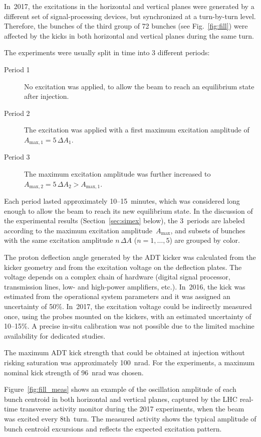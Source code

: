 \documentclass[
prstab
,reprint
,linenumbers
,longbibliography
,preprintnumbers
,showkeys
,amsfonts,amssymb,amsmath
,floatfix
]{revtex4-1}
\begin{document}
In~2017, the excitations in the horizontal and vertical planes were
generated by a different set of signal-processing devices, but
synchronized at a turn-by-turn level. Therefore, the bunches of the
third group of 72 bunches (see Fig.~\ref{fig:fill}) were affected by
the kicks in both horizontal and vertical planes during the same turn.

The experiments were usually split in time into 3 different periods:
%
\begin{description}
\item[Period 1] No excitation was applied, to allow the beam to reach
  an equilibrium state after injection.
\item[Period 2] The excitation was applied with a first maximum
  excitation amplitude of $A_{\mathrm{max,1}} = 5 \, \Delta A_1$.
\item[Period 3] The maximum excitation amplitude was further increased
  to $A_{\mathrm{max,2}} = 5 \, \Delta A_2 > A_{\mathrm{max,1}}$.
\end{description}
%
Each period lasted approximately 10--15~minutes, which was considered
long enough to allow the beam to reach its new equilibrium state. In
the discussion of the experimental results (Section~\ref{sec:simex}
below), the 3~periods are labeled according to the maximum excitation
amplitude~$A_\mathrm{max}$, and subsets of bunches with the same
excitation amplitude $n \, \Delta A$ ($n = 1, \ldots, 5$) are grouped
by color.

The proton deflection angle generated by the ADT kicker was calculated
from the kicker geometry and from the excitation voltage on the
deflection plates. The voltage depends on a complex chain of hardware
(digital signal processor, transmission lines, low- and high-power
amplifiers, etc.). In~2016, the kick was estimated from the
operational system parameters and it was assigned an uncertainty of
50\%. In~2017, the excitation voltage could be indirectly measured
once, using the probes mounted on the kickers, with an estimated
uncertainty of 10--15\%. A precise in-situ calibration was not
possible due to the limited machine availability for dedicated
studies.

The maximum ADT kick strength that could be obtained at injection
without risking saturation was approximately 100~nrad. For the
experiments, a maximum nominal kick strength of 96~nrad was chosen.

Figure~\ref{fig:fill_meas} shows an example of the oscillation
amplitude of each bunch centroid in both horizontal and vertical
planes, captured by the LHC real-time transverse activity monitor
during the 2017 experiments, when the beam was excited every
8th~turn. The measured activity shows the typical amplitude of bunch
centroid excursions and reflects the expected excitation pattern.
\end{document}
